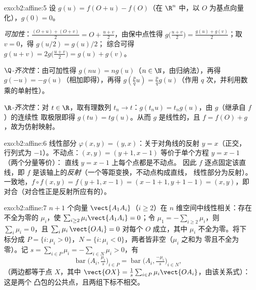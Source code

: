 \begin{solution}{exo:b2:affine:5}
设 $g(u) = f(O + u) - f(O)$（在 $\R^n$ 中，以
$O$ 为基点向量化），$g(0) = 0$。

\emph{可加性}：$\frac{(O + u) + (O + v)}{2} = O + \frac{u +
v}{2}$，由保中点性得 $g\bigl(\frac{u+v}{2}\bigr)
= \frac{g(u) + g(v)}{2}$；取 $v = 0$，得 $g(u/2) = g(u)/2$；
综合可得 $g(u + v) = 2g\bigl(\frac{u+v}{2}\bigr) = g(u) + g(v)$。

\emph{$\Q$-齐次性}：由可加性得 $g(nu) = ng(u)$（$n \in
\N$，由归纳法），再得 $g(-u) = -g(u)$（相加即得），再得 $g(\frac pq u) =
\frac pq g(u)$（作用 $q$ 次，并利用数乘的单射性）。

\emph{$\R$-齐次性}：对 $t \in \R$，取有理数列 $t_n \to
t$：$g(t_nu) = t_ng(u)$，由 $g$（继承自 $f$）的连续性
取极限即得 $g(tu) = tg(u)$。从而 $g$ 是线性的，且 $f =
f(O) + g$，故为仿射映射。
\end{solution}

\begin{solution}{exo:b2:affine:6}
线性部分 $\varphi(x,y) = (y, x)$：关于对角线的反射
$y = x$（正交，行列式为 $-1$）。不动点：$(x, y) = (y
+ 1, x - 1)$ 等价于单个方程 $y = x - 1$（两个分量等价）：
直线 $y = x - 1$ 上每个点都是不动点。
因此 $f$ 逐点固定该直线，即 $f$
是该轴上的\emph{反射}（一个等距变换，不动点构成直线，
线性部分为反射）。一致地，$f \circ
f(x,y) = f(y+1, x-1) = (x - 1 + 1, y + 1 - 1) = (x, y)$，即
对合（对合性正是反射所应有的）。
\end{solution}

\begin{solution}{exo:b2:affine:7}
$n + 1$ 个向量 $\vect{A_1A_i}$（$i \geq 2$）在
$n$ 维空间中线性相关：存在不全为零的 $\mu_i$，使 $\sum_{i\geq2}
\mu_i\vect{A_1A_i} = 0$；令 $\mu_1 = -\sum_{i \geq 2}\mu_i$，则
$\sum_{i}\mu_i = 0$，且 $\sum_i \mu_i\,\vect{OA_i} = 0$ 对每个
$O$ 成立，其中 $\mu_i$ 不全为零。将下标分成 $P = \{i : \mu_i >
0\}$，$N = \{i : \mu_i < 0\}$，两者皆非空（$\mu_i$ 之和为
零且不全为零）。记 $s = \sum_{i\in P}\mu_i =
-\sum_{i \in N}\mu_i > 0$，有
\[
\operatorname{bar}\bigl(A_i, \tfrac{\mu_i}{s}\bigr)_{i \in P}
= \operatorname{bar}\bigl(A_i, \tfrac{-\mu_i}{s}\bigr)_{i \in N},
\]
（两边都等于点 $X$，其中 $\vect{OX} = \frac1s\sum_{i\in
P}\mu_i\vect{OA_i}$，由该关系式）：这是两个
凸包的公共点，且两组下标不相交。
\end{solution}

